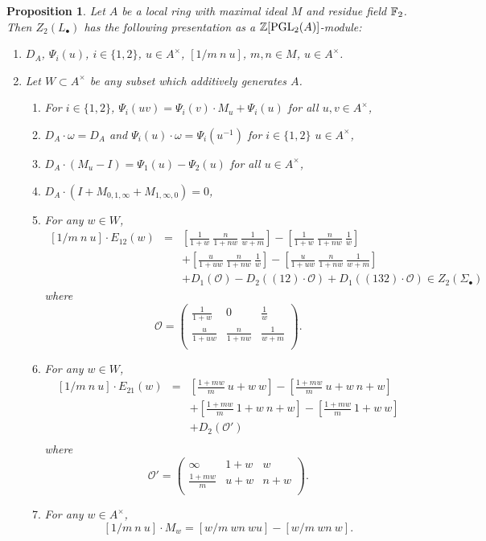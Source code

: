 \documentclass[12pt]{amsart}
\newtheorem{prop}[lem]{Proposition}
\theoremstyle{definition}
\newcommand{\F}[1]{\Bbb{F}_{#1}}
\newcommand{\Z}{\Bbb{Z}}
\newcommand{\oct}{\mathcal{O}}%
\newcommand{\scyc}[1]{\left[ #1 \right]} %
\newcommand{\pgl}[2]{\mathrm{PGL}_{#1}(#2)}
\newcommand{\suss}[2]{\psi_{#1}\left( #2\right)}
\newcommand{\Suss}[2]{\Psi_{#1}\left( #2\right)}
\newcommand{\cconst}[1]{D_{#1}}
\newcommand{\<}{\langle}
\renewcommand{\>}{\rangle}
\begin{document}
\begin{prop}\label{prop:lz2lpres}
 Let $A$ be a local ring with maximal ideal $M$ and residue field $\F{2}$. Then $Z_2(L_\bullet)$ has the following presentation as a $\Z[\pgl{2}{A}]$-module:

\begin{enumerate}
\item[Generators:]

$\cconst{A}$, $\Suss{i}{u}$, $i\in \{ 1,2\}$, $u\in A^\times$, $\scyc{ 1/m\ n\  u}$, $m,n\in M$, $u\in A^\times$.

\item[Relations:]  Let $W\subset A^\times$ be any subset which additively generates $A$.
\begin{enumerate}
\item For $i\in \{ 1,2\}$, $\Suss{i}{uv}=\Suss{i}{v}\cdot M_u+\Suss{i}{u}$ for all $u,v\in A^\times$,
\item $\cconst{A}\cdot\omega=\cconst{A}$ and $\Suss{i}{u}\cdot\omega=\Suss{i}{u^{-1}}$ for $i\in \{ 1,2\}$ $u\in A^\times$,
\item $\cconst{A}\cdot (M_u-I)=\Suss{1}{u}-\Suss{2}{u}$ for all $u\in A^\times$,
\item $\cconst{A}\cdot(I+M_{0,1,\infty}+M_{1,\infty,0})=0$,
\item For any $w\in W$,
\begin{eqnarray*}
\scyc{ 1/m\  n\ u}\cdot E_{12}(w)&=& \scyc{\frac{1}{1+w}\ \frac{n}{1+nw}\ \frac{1}{w+m}}-\scyc{\frac{1}{1+w}\ \frac{n}{1+nw}\ \frac{1}{w}} \\
&&+\scyc{\frac{u}{1+uw}\ \frac{n}{1+nw}\ \frac{1}{w}}-\scyc{\frac{u}{1+uw}\ \frac{n}{1+nw}\ \frac{1}{w+m}}\\
&&+ D_1(\oct)-D_2((12)\cdot\oct)+D_1((132)\cdot\oct)\in Z_2(\Sigma_\bullet)
\end{eqnarray*}
where 
\[
\oct=\left(
\begin{array}{lll}
\frac{1}{1+w}& 0&\frac{1}{w}\\
\frac{u}{1+uw}&\frac{n}{1+nw}&\frac{1}{w+m}\\
\end{array}
\right).
\]
\item For any $w\in W$,
\begin{eqnarray*}
 \scyc{ 1/m\  n\ u}\cdot E_{21}(w)&=&    \scyc{\frac{1+mw}{m}\ u+w\ w}-\scyc{\frac{1+mw}{m}\ u+w\ n+w} \\
&&+\scyc{\frac{1+mw}{m}\ 1+w\ n+w}-\scyc{\frac{1+mw}{m}\ 1+w\ w}\\    
&&+D_2(\oct')\\
\end{eqnarray*}
where 
\[
\oct'=\left(
\begin{array}{lll}
\infty& 1+w&{w}\\
\frac{1+mw}{m}&u+w&{n+w}\\
\end{array}
\right).
\]
\item For any $w\in A^\times$,
\[
\scyc{ 1/m\  n\ u}\cdot M_w=\scyc{w/m\ wn\ wu}-\scyc{ w/m\ wn\ w}.
\]
\end{enumerate}
\end{enumerate}
\end{prop}
\end{document}
